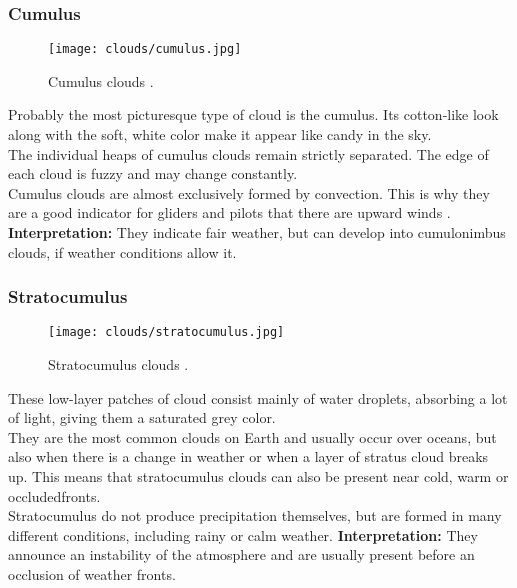 \subsubsection{Cumulus}
\begin{wrapfigure}[10]{r}{6.3cm}
    \vspace{-\baselineskip}
    \texttt{[image: clouds/cumulus.jpg]}
    \caption{Cumulus clouds \protect\cite{cloudtypes:meteoblue}.}
    \label{img:clouds:cumulus}
\end{wrapfigure}
Probably the most picturesque type of cloud is the cumulus. 
Its cotton-like look along with the soft, white color make it appear like candy in the sky.
\\
The individual heaps of cumulus clouds remain strictly separated.
The edge of each cloud is fuzzy and may change constantly.
\\
Cumulus clouds are almost exclusively formed by \gls{convection}.
This is why they are a good indicator for gliders and pilots that there are upward winds \protect\cite{cloudtypes:meteoblue}.
\emptyline
\textbf{Interpretation:}
They indicate fair weather, but can develop into cumulonimbus clouds, if weather conditions allow it.


\subsubsection{Stratocumulus}
\begin{wrapfigure}[11]{r}{6.3cm}
    \vspace{-\baselineskip}
    \texttt{[image: clouds/stratocumulus.jpg]}
    \caption{Stratocumulus clouds \protect\cite{cloudtypes:meteoblue}.}
    \label{img:clouds:stratocumulus}
\end{wrapfigure}
These low-layer patches of cloud consist mainly of water droplets, absorbing a lot of light, giving them a saturated grey color.
\\
They are the most common clouds on Earth and usually occur over oceans, but also when there is a change in weather or when a layer of stratus cloud breaks up.
This means that stratocumulus clouds can also be present near cold, warm or \gls{occludedfront}s.
\\
Stratocumulus do not produce \gls{precipitation} themselves, but are formed in many different conditions, including rainy or calm weather.
\emptyline
\textbf{Interpretation:}
They announce an instability of the atmosphere and are usually present before an occlusion of weather fronts.


